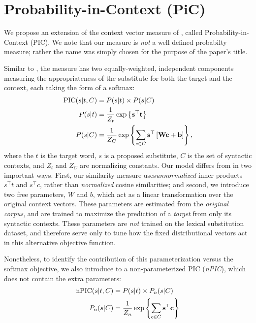 \section{Probability-in-Context (PiC)}

We propose an extension of the context vector measure of
, called Probability-in-Context (PIC).  We note that
our measure is {\em not} a well defined probabilty measure; rather the name was
simply chosen for the purpose of the paper's title.

Similar to \balAddCos, the measure has two equally-weighted, independent
components measuring the appropriateness of the substitute for both the target
and the context, each taking the form of a softmax:
\begin{equation}
  \begin{aligned}
  \mbox{PIC}(s | t, C) &= P(s | t) \times P(s | C)\\
  P(s | t) &= \frac{1}{Z_t}\exp\left\{{\mathbf{s}}^\top {\mathbf{t}}\right\}\\
  P(s | C) &= \frac{1}{Z_C}\exp\left\{\sum_{c\in C}{\mathbf{s}}^\top\left[{{\mathbf{W}}}{\mathbf{c}} + {\mathbf{b}}\right]\right\},
  \end{aligned}
  \label{eqn:pic}
\end{equation}
where the $t$ is the target word, $s$ is a proposed substitute, $C$ is the set
of syntactic contexts, and $Z_t$ and $Z_C$ are normalizing constants. Our
model differs from \mbox{\balAddCos} in two important ways. First, our
similarity measure uses{\em unnormalized} inner products $s^\top t$
and $s^\top c$, rather than {\em normalized} cosine similarities; and
second, we introduce two  free parameters, $W$ and $b$, which act as a linear
transformation over the original context vectors. These parameters are
estimated from the {\em original corpus}, and are trained to maximize the
prediction of a {\em target} from only its syntactic contexts. These parameters
are {\em not} trained on the lexical substitution dataset, and
therefore serve only to tune how the fixed distributional vectors act in this
alternative objective function.

Nonetheless, to identify the contribution of this parameterization versus the
softmax objective, we also introduce to a non-parameterized PIC ({\em nPIC}),
which does not contain the extra parameters:
\begin{equation}
  \begin{aligned}
  \mbox{nPIC}(s | t, C) &= P(s | t) \times P_n(s | C)\\
  P_n(s | C) &= \frac{1}{Z_n}\exp\left\{\sum_{c\in C}{\mathbf{s}}^\top {\mathbf{c}}\right\}
  \end{aligned}
  \label{eqn:npic}
\end{equation}


